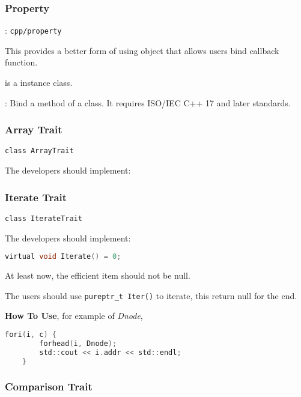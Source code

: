 
\subsubsection{Property}
: \verb`cpp/property`

This provides a better form of using object that allows users bind callback function.

 is a instance class.

: Bind a method of a class. It requires ISO/IEC C++ 17 and later standards.



\subsubsection{Array Trait}

\verb|class ArrayTrait|

The developers should implement:

\lstset{style=GlobalCxx}

\subsubsection{Iterate Trait}

\verb|class IterateTrait|

The developers should implement:

\lstset{style=GlobalC}
\begin{lstlisting}[language=C]
	virtual void Iterate() = 0;
\end{lstlisting}

At least now, the efficient item should not be null.

The users should use \verb|pureptr_t Iter()| to iterate, this return null for the end.

\textbf{How To Use}, for example of \textit{Dnode},

\lstset{style=GlobalC}
\begin{lstlisting}[language=C]
	fori(i, c) {
		forhead(i, Dnode);
		std::cout << i.addr << std::endl;
	}
\end{lstlisting}

\subsubsection{Comparison Trait}

